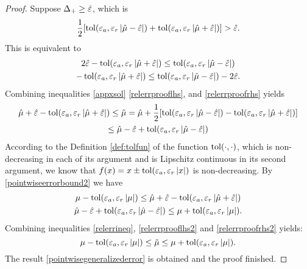 \documentclass{iitthesis}
\theoremstyle{definition}
\begin{document}
 \begin{proof}
Suppose $\Delta_+\geq \hat{\varepsilon}$, which is
 $$\frac{1}{2} [\operatorname{tol}(\varepsilon_a, \varepsilon_r \left \lvert \hat{\mu}-\hat{\varepsilon} \right \rvert) + \operatorname{tol}(\varepsilon_a, \varepsilon_r \left \lvert \hat{\mu}+\hat{\varepsilon} \right \rvert)] >\hat{\varepsilon}.$$
This is equivalent to
 \begin{gather}
 2\hat{\varepsilon}-\operatorname{tol}(\varepsilon_a, \varepsilon_r \left \lvert \hat{\mu}+\hat{\varepsilon} \right \rvert) \leq \operatorname{tol}(\varepsilon_a, \varepsilon_r \left \lvert \hat{\mu}-\hat{\varepsilon} \right \rvert) \label{relerrprooflhs}\\
 -\operatorname{tol}(\varepsilon_a, \varepsilon_r \left \lvert \hat{\mu}+\hat{\varepsilon} \right \rvert) \leq \operatorname{tol}(\varepsilon_a, \varepsilon_r \left \lvert \hat{\mu}-\hat{\varepsilon} \right \rvert)-2\hat{\varepsilon}. \label{relerrproofrhs}
 \end{gather}
 Combining inequalities \eqref{appxsol} \eqref{relerrprooflhs}, and \eqref{relerrproofrhs} yields
 \begin{multline} \label{relerrineq}
 \hat{\mu}+\hat{\varepsilon} -\operatorname{tol}(\varepsilon_a, \varepsilon_r \left \lvert \hat{\mu}+ \hat{\varepsilon} \right \rvert)\leq \tilde{\mu} = \hat{\mu}+\frac{1}{2} [\operatorname{tol}(\varepsilon_a, \varepsilon_r \left \lvert \hat{\mu}-\hat{\varepsilon} \right \rvert) - \operatorname{tol}(\varepsilon_a, \varepsilon_r \left \lvert \hat{\mu}+\hat{\varepsilon} \right \rvert)] \\ \leq  \hat{\mu}-\hat{\varepsilon} +\operatorname{tol}(\varepsilon_a, \varepsilon_r \left \lvert \hat{\mu}-\hat{\varepsilon} \right \rvert)
 \end{multline}
 According to the Definition \ref{def:tolfun} of the function $\operatorname{tol}(\cdot, \cdot)$, which is non-decreasing in each of its argument and is Lipschitz continuous in its second argument, we know that $f(x) = x \pm \operatorname{tol}(\varepsilon_a,\varepsilon_r\left \lvert x \right \rvert)$ is non-decreasing. By \eqref{pointwiseerrorbound2} we have 
 \begin{gather}
 \mu-\operatorname{tol}(\varepsilon_a, \varepsilon_r \left \lvert \mu \right \rvert) \leq \hat{\mu}+\hat{\varepsilon} -\operatorname{tol}(\varepsilon_a, \varepsilon_r \left \lvert \hat{\mu}+ \hat{\varepsilon} \right \rvert) \label{relerrprooflhs2}\\
\hat{\mu}-\hat{\varepsilon} +\operatorname{tol}(\varepsilon_a, \varepsilon_r \left \lvert \hat{\mu}- \hat{\varepsilon} \right \rvert) \leq \mu+\operatorname{tol}(\varepsilon_a, \varepsilon_r \left \lvert \mu \right \rvert).\label{relerrproofrhs2}
 \end{gather}
Combining inequalities \eqref{relerrineq}, \eqref{relerrprooflhs2} and \eqref{relerrproofrhs2} yields:
\begin{equation} 
 \mu -\operatorname{tol}(\varepsilon_a, \varepsilon_r \left \lvert \mu \right \rvert)\leq \tilde{\mu} \leq  \mu +\operatorname{tol}(\varepsilon_a, \varepsilon_r\left \lvert \mu \right \rvert).
 \end{equation}
The result \eqref{pointwisegeneralizederror} is obtained and the proof finished.
\end{proof}
\end{document}
